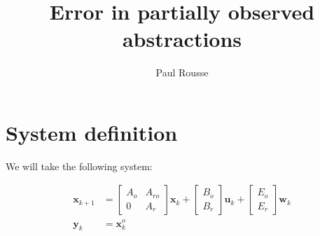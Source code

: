 \documentclass{article}
\begin{document}
\title{Error in partially observed abstractions}
\author{Paul Rousse}
\maketitle



\newcommand{\mle}{\prec}
\newcommand{\mleq}{\preceq}
\newcommand{\minf}[1]{\underline{#1}}
\newcommand{\msup}[1]{\overline{#1}}

\newcommand{\vect}[1]{\mathbf{#1}}

\newcommand{\x}{\vect{x}}%
\renewcommand{\u}{\vect{u}}%
\newcommand{\w}{\vect{w}}%

\newcommand{\y}{\vect{y}}%
\newcommand{\yk}{\vect{y}_k}%
\newcommand{\ykn}{\vect{y}_{k+1}}%

\newcommand{\xk}{\vect{x}_k}%
\newcommand{\xkn}{\vect{x}_{k+1}}%

\newcommand{\uk}{\vect{u}_k}%
\newcommand{\wk}{\vect{w}_k}%

\newcommand{\xo}{\vect{x}^o}%
\newcommand{\xr}{\vect{x}^r}%

\newcommand{\Ao}{A_o}%
\newcommand{\Ar}{A_r}%
\newcommand{\Aro}{A_{ro}}%

\newcommand{\Bo}{B_o}%
\newcommand{\Br}{B_r}%

\newcommand{\Eo}{E_o}%
\newcommand{\Er}{E_r}%

\newcommand{\Xr}{X_r}%

\newcommand{\Xrinv}{\mathcal{X}_r}%
\newcommand{\xrinf}{\minf{\x}_r}%
\newcommand{\xrsup}{\msup{\x}_r}%


\newcommand{\Wsup}{\msup{W}}
\newcommand{\Winf}{\minf{W}}
\newcommand{\Wk}{W_k}

\renewcommand{\wr}{\vect{w}^r}
\newcommand{\Wrsup}{\msup{W}^r}
\newcommand{\Wrinf}{\minf{W}^r}
\newcommand{\Wrk}{W^r_k}

\newcommand{\traj}{\varphi}

\section{System definition}
We will take the following system:

\begin{equation}
\begin{aligned}
\xkn &=
\begin{bmatrix} \Ao&\Aro\\ 0& \Ar \end{bmatrix} \xk + 
\begin{bmatrix} \Bo\\ \Br \end{bmatrix} \uk + 
\begin{bmatrix} \Eo\\ \Er \end{bmatrix} \wk
\\
\yk &= \xo_k
\end{aligned}
\end{equation}
\end{document}
